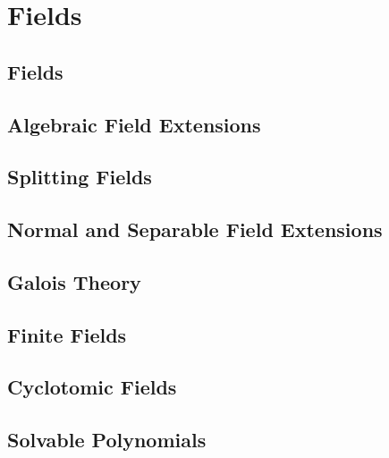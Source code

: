 
\part{Fields}\label{cha:fields}
\chapter{Fields}
\begin{defn}[Field]\label{defn:field}
\end{defn}

\chapter{Algebraic Field Extensions}
\chapter{Splitting Fields}
\chapter{Normal and Separable Field Extensions}
\chapter{Galois Theory}
\chapter{Finite Fields}
\chapter{Cyclotomic Fields}
\chapter{Solvable Polynomials}